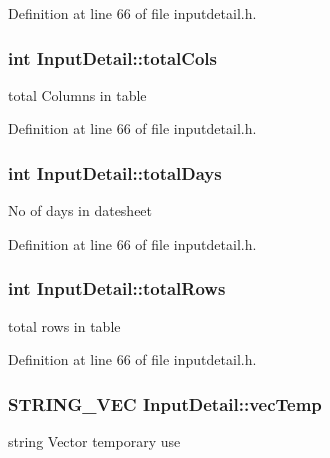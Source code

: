 Definition at line 66 of file inputdetail.\-h.

\hypertarget{classInputDetail_aeba19a14044746fd0c87b356d05d88c0}{
\subsubsection[{total\-Cols}]{\setlength{\rightskip}{0pt plus 5cm}int Input\-Detail\-::total\-Cols\hspace{0.3cm}{\ttfamily [protected]}}}\label{classInputDetail_aeba19a14044746fd0c87b356d05d88c0}
total Columns in table 

Definition at line 66 of file inputdetail.\-h.

\hypertarget{classInputDetail_a8d1ba029791bb9b87330400d82cdbcde}{
\subsubsection[{total\-Days}]{\setlength{\rightskip}{0pt plus 5cm}int Input\-Detail\-::total\-Days\hspace{0.3cm}{\ttfamily [protected]}}}\label{classInputDetail_a8d1ba029791bb9b87330400d82cdbcde}
No of days in datesheet 

Definition at line 66 of file inputdetail.\-h.

\hypertarget{classInputDetail_a3710702eafae009629e99f1dc76d5285}{
\subsubsection[{total\-Rows}]{\setlength{\rightskip}{0pt plus 5cm}int Input\-Detail\-::total\-Rows\hspace{0.3cm}{\ttfamily [protected]}}}\label{classInputDetail_a3710702eafae009629e99f1dc76d5285}
total rows in table 

Definition at line 66 of file inputdetail.\-h.

\hypertarget{classInputDetail_abee6a659eb2e34b260aaf8b05d6003b4}{
\subsubsection[{vec\-Temp}]{\setlength{\rightskip}{0pt plus 5cm}S\-T\-R\-I\-N\-G\-\_\-\-V\-E\-C Input\-Detail\-::vec\-Temp\hspace{0.3cm}{\ttfamily [protected]}}}\label{classInputDetail_abee6a659eb2e34b260aaf8b05d6003b4}
string Vector temporary use 

